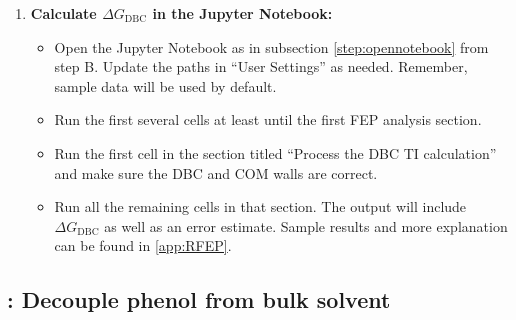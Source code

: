 \documentclass[9pt,tutorial,pubversion]{Styling/livecoms}
\begin{document}
\begin{enumerate}
\begin{enumerate}[label=\alph*., ref=\theenumi.\alph*]
\begin{itemize}
            \end{itemize}
            \item \textbf{Calculate $\Delta G_\mathrm{DBC}$ in the Jupyter Notebook:}
            \begin{itemize}
                \item Open the Jupyter Notebook as in subsection \ref{step:opennotebook} from step B. Update the paths in ``User Settings'' as needed. Remember, sample data will be used by default.
                \item Run the first several cells at least until the first FEP analysis section. 
                \item Run the first cell in the section titled ``Process the DBC TI calculation'' and make sure the DBC and COM walls are correct.
                \item Run all the remaining cells in that section. The output will include $\Delta G_\mathrm{DBC}$ as well as an error estimate. Sample results and more explanation can be found in \ref{app:RFEP}.
            \end{itemize}
        \end{enumerate}
    \end{enumerate}
    
\subsection{\hspace{-1em}: Decouple phenol from bulk solvent}
\end{document}
